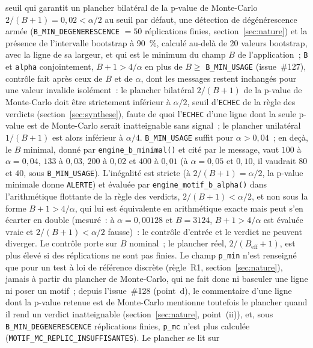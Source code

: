 \documentclass[a4paper,11pt]{article}
\newcommand{\code}[1]{\texttt{\small #1}}
\begin{document}
\begin{itemize}[itemsep=2pt]
  seuil qui garantit un plancher bilatéral de la p-value de Monte-Carlo
  $2/(B+1) = 0{,}02 < \alpha/2$ au seuil par défaut, une détection de dégénérescence armée
  (\code{B\_MIN\_DEGENERESCENCE} $= 50$ réplications finies, section~\ref{sec:nature}) et la
  présence de l'intervalle bootstrap à 90~\%, calculé au-delà de 20 valeurs bootstrap, avec la
  ligne de sa largeur, et qui est le minimum du champ $B$ de l'application~; \code{B} et
  \code{alpha} conjointement, $B + 1 > 4/\alpha$ en plus de $B \ge$ \code{B\_MIN\_USAGE}
  (issue~\#127), contrôle fait après ceux de $B$ et de $\alpha$, dont les messages restent
  inchangés pour une valeur invalide isolément~: le plancher bilatéral $2/(B+1)$ de la p-value de
  Monte-Carlo doit être strictement inférieur à $\alpha/2$, seuil d'\code{ECHEC} de la règle des
  verdicts (section~\ref{sec:synthese}), faute de quoi l'\code{ECHEC} d'une ligne dont la seule
  p-value est de Monte-Carlo serait inatteignable sans signal~; le plancher unilatéral
  $1/(B+1)$ est alors inférieur à $\alpha/4$. \code{B\_MIN\_USAGE} suffit pour
  $\alpha > 0{,}04$~; en deçà, le $B$ minimal, donné par \code{engine\_b\_minimal()} et cité par
  le message, vaut $100$ à $\alpha = 0{,}04$, $133$ à $0{,}03$, $200$ à $0{,}02$ et $400$ à
  $0{,}01$ (à $\alpha = 0{,}05$ et $0{,}10$, il vaudrait $80$ et $40$, sous
  \code{B\_MIN\_USAGE}). L'inégalité est stricte (à $2/(B+1) = \alpha/2$, la p-value minimale
  donne \code{ALERTE}) et évaluée par \code{engine\_motif\_b\_alpha()} dans l'arithmétique
  flottante de la règle des verdicts, $2/(B+1) < \alpha/2$, et non sous la forme
  $B + 1 > 4/\alpha$, qui lui est équivalente en arithmétique exacte mais peut s'en écarter en
  double (mesuré~: à $\alpha = 0{,}00128$ et $B = 3124$, $B + 1 > 4/\alpha$ est évaluée vraie et
  $2/(B+1) < \alpha/2$ fausse)~: le contrôle d'entrée et le verdict ne peuvent diverger. Le contrôle porte sur $B$ nominal~; le plancher réel,
  $2/(B_{\text{eff}}+1)$, est plus élevé si des réplications ne sont pas finies. Le champ
  \code{p\_min} n'est renseigné que pour un test à loi de référence discrète (règle~R1,
  section~\ref{sec:nature}), jamais à partir du plancher de Monte-Carlo, qui ne fait donc ni
  basculer une ligne ni poser un motif~; depuis l'issue~\#128 (point~d), le commentaire d'une
  ligne dont la p-value retenue est de Monte-Carlo mentionne toutefois le plancher quand il rend
  un verdict inatteignable (section~\ref{sec:nature}, point~(ii)), et, sous
  \code{B\_MIN\_DEGENERESCENCE} réplications finies, \code{p\_mc} n'est plus calculée
  (\code{MOTIF\_MC\_REPLIC\_INSUFFISANTES}). Le plancher se lit sur

\end{itemize}
\end{document}
